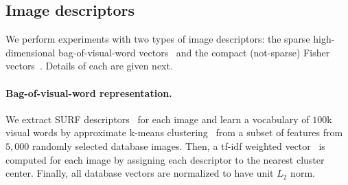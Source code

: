 
    \subsection{Image descriptors}
      We perform experiments with two types of image descriptors: the sparse high-dimensional bag-of-visual-word vectors~\cite{Sivic03} and the compact (not-sparse) Fisher vectors~\cite{Jegou12}. Details of each are given next.

      \paragraph{Bag-of-visual-word representation.}
         We extract SURF descriptors~\cite{Bay06} for each image and learn a vocabulary of $100$k visual words by approximate k-means clustering~\cite{Philbin07} from a subset of features from $5,000$ randomly selected database images. Then, a tf-idf weighted vector~\cite{Sivic03} is computed for each image by assigning each descriptor to the nearest cluster center.  Finally, all database vectors are normalized to have unit $L_2$ norm.
        
